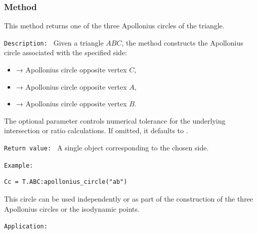 \subsubsection{Method }
\label{ssub:apollonius_circle}

This method returns one of the three Apollonius circles of the triangle.

\medskip

\texttt{Description: }
Given a triangle $ABC$, the method  constructs the
Apollonius circle associated with the specified side:
\begin{itemize}
  \item {} → Apollonius circle opposite vertex $C$,
  \item {} → Apollonius circle opposite vertex $A$,
  \item {} → Apollonius circle opposite vertex $B$.
\end{itemize}

The optional parameter  controls numerical tolerance for the
underlying intersection or ratio calculations.
If omitted, it defaults to .

\medskip
\texttt{Return value: }
A single  object corresponding to the chosen side.

\medskip

\texttt{Example: }
\begin{verbatim}
Cc = T.ABC:apollonius_circle("ab")
\end{verbatim}

This circle can be used independently or as part of the construction of the
three Apollonius circles or the isodynamic points.

\medskip
\texttt{Application: }

\begin{tkzexample}[latex = .5\textwidth]
\begin{center}
\end{center}
\end{tkzexample}



